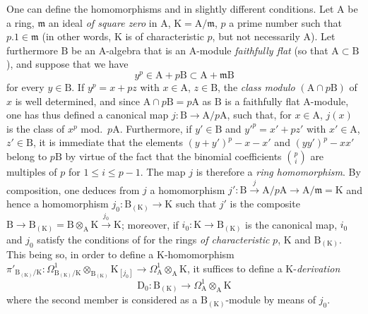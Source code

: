 \begin{remark}[22.4.8]
\label{0.22.4.8}
One can define the homomorphisms  and  in slightly different conditions.
Let $\mathrm{A}$ be a ring, $\mathfrak{m}$ an ideal \emph{of square zero} in $\mathrm{A}$, $\mathrm{K}=\mathrm{A}/\mathfrak{m}$, $p$ a prime number such that $p.1\in\mathfrak{m}$ (in other words, $\mathrm{K}$ is of characteristic $p$, but not necessarily $\mathrm{A}$).
Let furthermore $\mathrm{B}$ be an $\mathrm{A}$-algebra that is an $\mathrm{A}$-module \emph{faithfully flat} (so that $\mathrm{A}\subset\mathrm{B}$), and suppose that we have
\[
\label{0.22.4.8.1}
  y^p\in\mathrm{A}+p\mathrm{B}\subset\mathrm{A}+\mathfrak{m}\mathrm{B}
  \tag{22.4.8.1}
\]
for every $y\in\mathrm{B}$.
If $y^p=x+pz$ with $x\in\mathrm{A}$, $z\in\mathrm{B}$, the \emph{class modulo} $(\mathrm{A}\cap p\mathrm{B})$ of $x$ is well determined, and since $\mathrm{A}\cap p\mathrm{B}=p\mathrm{A}$ as $\mathrm{B}$ is a faithfully flat $\mathrm{A}$-module, one has thus defined a canonical map $j:\mathrm{B}\to\mathrm{A}/p\mathrm{A}$, such that, for $x\in\mathrm{A}$, $j(x)$ is the class of $x^p$ mod.~$p\mathrm{A}$.
Furthermore, if $y'\in\mathrm{B}$ and $y'^p=x'+pz'$ with $x'\in\mathrm{A}$, $z'\in\mathrm{B}$, it is immediate that the elements $(y+y')^p-x-x'$ and $(yy')^p-xx'$ belong to $p\mathrm{B}$ by virtue of the fact that the binomial coefficients $\binom{p}{i}$ are multiples of $p$ for $1\leq i\leq p-1$.
The map $j$ is therefore a \emph{ring homomorphism}.
By composition, one deduces from $j$ a homomorphism $j':\mathrm{B}\xrightarrow{j}\mathrm{A}/p\mathrm{A}\to\mathrm{A}/\mathfrak{m}=\mathrm{K}$ and hence a homomorphism $j_0:\mathrm{B}_{(\mathrm{K})}\to\mathrm{K}$ such that $j'$ is the composite $\mathrm{B}\to\mathrm{B}_{(\mathrm{K})}=\mathrm{B}\otimes_\mathrm{A}\mathrm{K}\xrightarrow{j_0}\mathrm{K}$; moreover, if $i_0:\mathrm{K}\to\mathrm{B}_{(\mathrm{K})}$ is the canonical map, $i_0$ and $j_0$ satisfy the conditions of  for the rings \emph{of characteristic} $p$, $\mathrm{K}$ and $\mathrm{B}_{(\mathrm{K})}$.
This being so, in order to define a $\mathrm{K}$-homomorphism $\pi'_{\mathrm{B}_{(\mathrm{K})}/\mathrm{K}}:\Omega^1_{\mathrm{B}_{(\mathrm{K})}/\mathrm{K}}\otimes_{\mathrm{B}_{(\mathrm{K})}}\mathrm{K}_{[j_0]}\to\Omega^1_\mathrm{A}\otimes_\mathrm{A}\mathrm{K}$, it suffices  to define a $\mathrm{K}$-\emph{derivation}
\[
\label{0.22.4.8.2}
  \mathrm{D}_0:\mathrm{B}_{(\mathrm{K})}\to\Omega^1_\mathrm{A}\otimes_\mathrm{A}\mathrm{K}
  \tag{22.4.8.2}
\]
where the second member is considered as a $\mathrm{B}_{(\mathrm{K})}$-module by means of $j_0$.

\end{remark}
